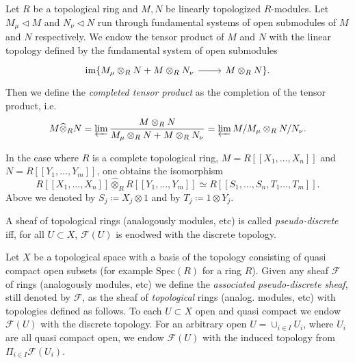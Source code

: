 \documentclass[../Main]{subfiles}
\begin{document}
\begin{defn}
	Let $R$ be a topological ring and $M, N$ be linearly topologized $R$-modules.
	Let $M_\mu \triangleleft M$ and $N_\nu \triangleleft N$ run through
	fundamental systems of open submodules of $M$ and $N$ respectively.
	We endow the tensor product of $M$ and $N$ with the linear topology
	defined by the fundamental system of open submodules
	\begin{equation*}
	\begin{tikzcd}
	\ima \{ M_\mu \otimes_R N + M \otimes_R N_\nu 
		\arrow[r, "", rightarrow] &
	M \otimes_R N \}
	.\end{tikzcd}
	\end{equation*}
	Then we define the {\em completed tensor product} as the completion
	of the tensor product, i.e.
	\begin{equation*}
		M \widehat{\otimes}_R N = 
		\varprojlim \frac{M \otimes_R N}{M_\mu \otimes_R N +
		M \otimes_R N_\nu} =
		\varprojlim M / M_\mu \otimes_R N / N_\nu
	.\end{equation*}
\end{defn}


\begin{rem}[]
	In the case where $R$ is a complete topological ring,
	$M = R [\![ X_1, \ldots, X_{ n } ]\!]$
	and $N = R [\![ Y_1, \ldots, Y_{ m } ]\!]$,
	one obtains the isomorphism
	\begin{equation*}
		R [\![ X_1, \ldots, X_{ n } ]\!] \widehat{\otimes}_R
		R [\![ Y_1, \ldots, Y_{ m } ]\!] \simeq
		R [\![ S_1, \ldots, S_n, T_1 \ldots, T_{ m } ]\!]
	.\end{equation*}
	Above we denoted by $S_j \coloneqq X_j \otimes 1$
	and by $T_j \coloneqq 1 \otimes Y_j$.
\end{rem}


\begin{defn}
	A sheaf of topological rings (analogously modules, etc)
	is called {\em pseudo-discrete} iff, for all $U \subset X$,
	$\mathcal{F}(U)$ is enodwed with the discrete topology.
\end{defn}


\begin{defn}\label{defn:AssociatePDSheaf}
	Let $X$ be a topological space with a basis of the topology
	consisting of quasi compact open subsets (for example $\mathrm{Spec}(R)$
	for a ring $R$).
	Given any sheaf $\mathcal{F}$ of rings (analogously modules, etc)
	we define the {\em associated pseudo-discrete sheaf},
	still denoted by $\mathcal{F}$, as the sheaf
	of {\em topological} rings (analog$.$ modules, etc)
	with topologies defined as follows.
	To each $U \subset X$ open and quasi compact we endow
	$\mathcal{F}(U)$ with the discrete topology.
	For an arbitrary open $U = \cup_{i \in I} U_i$, where $U_i$ are all
	quasi compact open, we endow $\mathcal{F}(U)$ with the
	induced topology from $\Pi_{i \in I} \mathcal{F}(U_i)$.
\end{defn}
\end{document}
